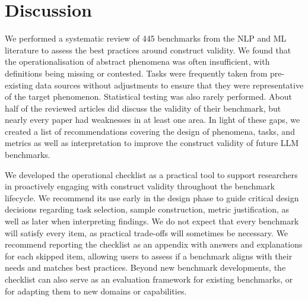 \section{Discussion}
\label{sec:limitations}

We performed a systematic review of 445 benchmarks from the NLP and ML literature to assess the best practices around construct validity. We found that the operationalisation of abstract phenomena was often insufficient, with definitions being missing or contested. Tasks were frequently taken from pre-existing data sources without adjustments to ensure that they were representative of the target phenomenon. Statistical testing was also rarely performed. About half of the reviewed articles did discuss the validity of their benchmark, but nearly every paper had weaknesses in at least one area. In light of these gaps, we created a list of recommendations covering the design of phenomena, tasks, and metrics as well as interpretation to improve the construct validity of future LLM benchmarks.

We developed the operational checklist as a practical tool to support researchers in proactively engaging with construct validity throughout the benchmark lifecycle. We recommend its use early in the design phase to guide critical design decisions regarding task selection, sample construction, metric justification, as well as later when interpreting findings. We do not expect that every benchmark will satisfy every item, as practical trade-offs will sometimes be necessary. We recommend reporting the checklist as an appendix with answers and explanations for each skipped item, allowing users to assess if a benchmark aligns with their needs and matches best practices.
Beyond new benchmark developments, the checklist can also serve as an evaluation framework for existing benchmarks, or for adapting them to new domains or capabilities.


